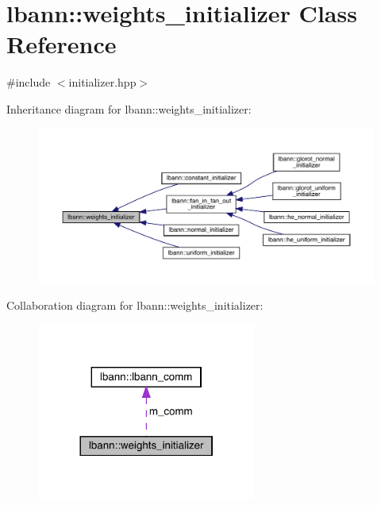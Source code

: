\hypertarget{classlbann_1_1weights__initializer}{}\section{lbann\+:\+:weights\+\_\+initializer Class Reference}
\label{classlbann_1_1weights__initializer}


{\ttfamily \#include $<$initializer.\+hpp$>$}



Inheritance diagram for lbann\+:\+:weights\+\_\+initializer\+:\nopagebreak
\begin{figure}[H]
\begin{center}
\leavevmode
\includegraphics[width=350pt]{classlbann_1_1weights__initializer__inherit__graph}
\end{center}
\end{figure}


Collaboration diagram for lbann\+:\+:weights\+\_\+initializer\+:\nopagebreak
\begin{figure}[H]
\begin{center}
\leavevmode
\includegraphics[width=204pt]{classlbann_1_1weights__initializer__coll__graph}
\end{center}
\end{figure}
